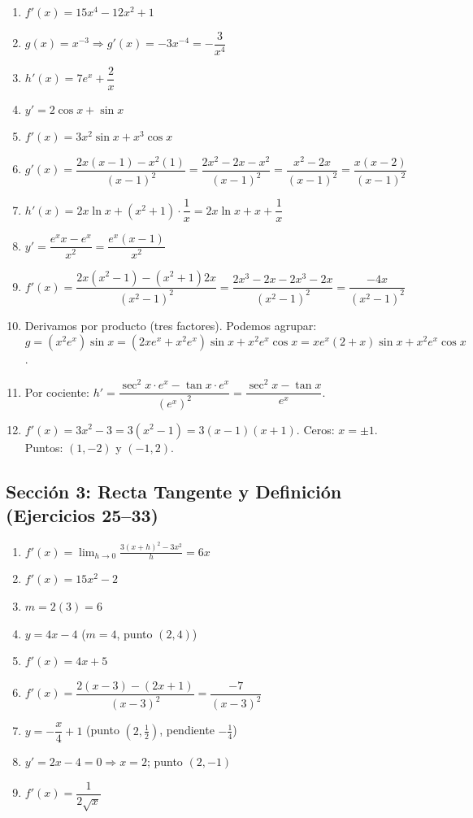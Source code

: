 \documentclass[12pt, letterpaper]{article}
\begin{document}
\begin{enumerate}[resume=respuestas, leftmargin=*, label=\textbf{\arabic*.}]
  \item $f'(x) = 15x^4 - 12x^2 + 1$
  \item $g(x) = x^{-3} \Rightarrow g'(x) = -3x^{-4} = -\dfrac{3}{x^4}$
  \item $h'(x) = 7e^x + \dfrac{2}{x}$
  \item $y' = 2\cos x + \sin x$
  \item $f'(x) = 3x^2 \sin x + x^3 \cos x$
  \item $g'(x) = \dfrac{2x(x - 1) - x^2(1)}{(x - 1)^2} = \dfrac{2x^2 - 2x - x^2}{(x - 1)^2} = \dfrac{x^2 - 2x}{(x - 1)^2} = \dfrac{x(x - 2)}{(x - 1)^2}$
  \item $h'(x) = 2x \ln x + (x^2 + 1) \cdot \dfrac{1}{x} = 2x\ln x + x + \dfrac{1}{x}$
  \item $y' = \dfrac{e^x x - e^x}{x^2} = \dfrac{e^x(x - 1)}{x^2}$
  \item $f'(x) = \dfrac{2x(x^2 - 1) - (x^2 + 1)2x}{(x^2 - 1)^2} = \dfrac{2x^3 - 2x - 2x^3 - 2x}{(x^2 - 1)^2} = \dfrac{-4x}{(x^2 - 1)^2}$
  \item Derivamos por producto (tres factores). Podemos agrupar: $g = (x^2 e^x) \sin x = (2x e^x + x^2 e^x)\sin x + x^2 e^x \cos x = x e^x(2 + x)\sin x + x^2 e^x \cos x$.
  \item Por cociente: $h' = \dfrac{\sec^2 x \cdot e^x - \tan x \cdot e^x}{(e^x)^2} = \dfrac{\sec^2 x - \tan x}{e^x}$.
  \item $f'(x) = 3x^2 - 3 = 3(x^2 - 1) = 3(x - 1)(x + 1)$. Ceros: $x = \pm 1$. Puntos: $(1, -2)$ y $(-1, 2)$.
\end{enumerate}


\subsection*{Sección 3: Recta Tangente y Definición (Ejercicios 25--33)}
\begin{enumerate}[resume=respuestas, leftmargin=*, label=\textbf{\arabic*.}]
  \item $f'(x) = \displaystyle\lim_{h \to 0} \frac{3(x + h)^2 - 3x^2}{h} = 6x$
  \item $f'(x) = 15x^2 - 2$
  \item $m = 2(3) = 6$
  \item $y = 4x - 4$ \quad ($m = 4$, punto $(2, 4)$)
  \item $f'(x) = 4x + 5$
  \item $f'(x) = \dfrac{2(x - 3) - (2x + 1)}{(x - 3)^2} = \dfrac{-7}{(x - 3)^2}$
  \item $y = -\dfrac{x}{4} + 1$ \quad (punto $\left(2, \frac{1}{2}\right)$, pendiente $-\frac{1}{4}$)
  \item $y' = 2x - 4 = 0 \Rightarrow x = 2$; punto $(2, -1)$
  \item $f'(x) = \dfrac{1}{2\sqrt{x}}$
\end{enumerate}
\end{document}
